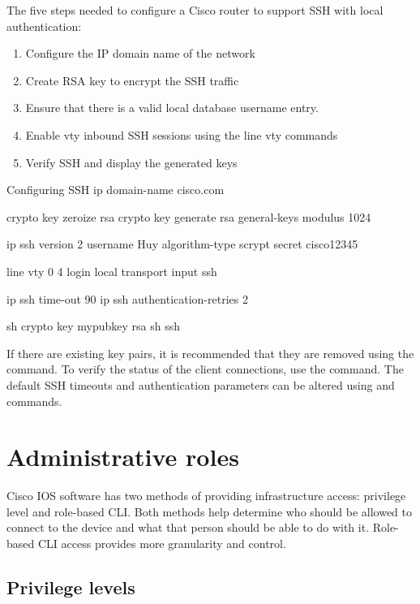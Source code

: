 The five steps needed to configure a Cisco router to support SSH with local authentication:

\begin{enumerate}
\item Configure the IP domain name of the network
\item Create RSA key to encrypt the SSH traffic
\item Ensure that there is a valid local database username entry.
\item Enable vty inbound SSH sessions using the line vty commands
\item Verify SSH and display the generated keys
\end{enumerate}

\begin{sexylisting}{Configuring SSH}
ip domain-name cisco.com

crypto key zeroize rsa
crypto key generate rsa general-keys modulus 1024

ip ssh version 2
username Huy algorithm-type scrypt secret cisco12345

line vty 0 4
  login local
  transport input ssh

ip ssh time-out 90
ip ssh authentication-retries 2

sh crypto key mypubkey rsa
sh ssh
\end{sexylisting}

If there are existing key pairs, it is recommended that they are removed using the  command. To verify the status of the client connections, use the  command. The default SSH timeouts and authentication parameters can be altered using  and  commands.

\section{Administrative roles}

Cisco IOS software has two methods of providing infrastructure access: privilege level and role-based CLI. Both methods help determine who should be allowed to connect to the device and what that person should be able to do with it. Role-based CLI access provides more granularity and control.

\subsection{Privilege levels}

